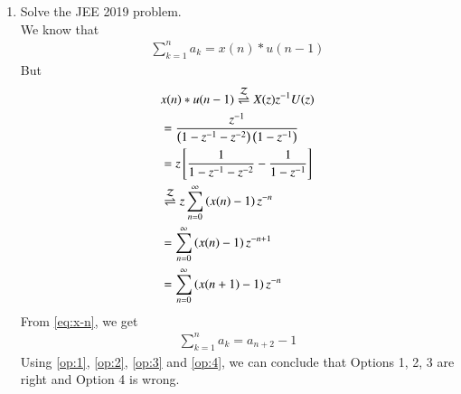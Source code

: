\documentclass[journal,12pt,twocolumn]{IEEEtran}
\renewcommand\thesection{\arabic{section}}
\begin{document}
\begin{enumerate}[label=\thesection.\arabic*,ref=\thesection.\theenumi]
\item Solve the JEE 2019 problem. \\
	\solution We know that
	\begin{align}
		\sum_{k = 1}^{n}a_k = x(n)*u(n - 1)
	\end{align}
	But
	\begin{align*}
		&x(n)*u(n - 1) \overset{\mathcal{Z}}{ \rightleftharpoons} X(z)z^{-1}U(z) \\
		&= \frac{z^{-1}}{\left(1 - z^{-1} - z^{-2}\right)\left(1 - z^{-1}\right)} \\
		&= z{}\left[\frac{1}{1 - z^{-1} - z^{-2}} - \frac{1}{1 - z^{-1}}\right] \\
		&\overset{\mathcal{Z}}{ \rightleftharpoons} z\sum_{n = 0}^{\infty}\left(x(n) - 1\right)z^{-n} \\
		&= \sum_{n = 0}^{\infty}\left(x(n) - 1\right)z^{-n + 1} \\
		&= \sum_{n = 0}^{\infty}\left(x(n + 1) - 1\right)z^{-n} \\
	\end{align*}
	From \eqref{eq:x-n}, we get
	\begin{align}
		\sum_{k = 1}^{n}a_k = a_{n+2} - 1 \label{op:1}
	\end{align}
	Using \eqref{op:1}, \eqref{op:2}, \eqref{op:3} and \eqref{op:4}, we can conclude that Options 1, 2, 3 are right and Option 4 is wrong.

\end{enumerate}
\end{document}
